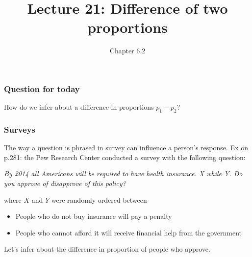 \documentclass[handout]{beamer}
\title{Lecture 21: Difference of two proportions}
\author{Chapter 6.2}
\date{}
\newcommand{\blue}[1]{\textcolor{blue2}{#1}}
\begin{document}
\begin{frame}
\titlepage
\end{frame}


\begin{frame}[fragile]
\frametitle{Question for today}

How do we infer about a difference in proportions $p_1-p_2$?

\end{frame}


\begin{frame}[fragile]
\frametitle{Surveys}

The way a question is phrased in survey can influence a person's response.  Ex on p.281: the Pew Research Center conducted a survey with the following question:

\pause\vspace{0.5cm}

\textit{By 2014 all Americans will be required to have health insurance.  \blue{X while Y}.  Do you approve of disapprove of this policy?}

\pause\vspace{0.5cm}

where $X$ and $Y$ were randomly ordered between
\begin{itemize}
\item People who do not buy insurance will pay a penalty
\item People who cannot afford it will receive financial help from the government
\end{itemize}

\vspace{0.5cm}

\pause Let's infer about the difference in proportion of people who \blue{approve}.

\end{frame}
\end{document}

